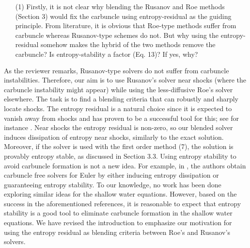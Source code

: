 \documentclass[english,11pt]{article}
\begin{document}
\bigskip
{\color{red}
  \begin{itemize}
    \item[(1)]
      Firstly, it is not clear why blending the Rusanov and Roe methods (Section 3) would fix the carbuncle
      using entropy-residual as the guiding principle. From literature, it is obvious that Roe-type methods suffer
      from carbuncle whereas Rusanov-type schemes do not. But why using the entropy-residual somehow
      makes the hybrid of the two methods remove the carbuncle? Is entropy-stability a factor (Eq. 13)? If yes,
      why?
  \end{itemize}
}
\noindent
As the reviewer remarks, Rusanov-type solvers do not suffer from carbuncle instabilities. Therefore,
our aim is to use Rusanov's solver near shocks (where the carbuncle instability might appear) 
while using the less-diffusive Roe's solver elsewhere.
The task is to find a blending criteria that can robustly and sharply locate shocks.
The entropy residual is a natural choice since it is expected to vanish away
from shocks and has proven to be a successful tool for this; see for instance
\cite{guermond2011,guermond2018}. 
%
Near shocks the entropy residual is non-zero, so our blended solver induces dissipation of entropy near shocks,
similarly to the exact solution. Moreover, if the solver is used with the first order method (7),
the solution is provably entropy stable, as discussed in Section 3.3.
Using entropy stability to avoid carbuncle formation is not a new idea. For example, in \cite{ismail2009,ismail2009v2},
the authors obtain carbuncle free solvers for Euler by either inducing entropy dissipation or guaranteeing entropy stability. 
To our knowledge, no work has been done exploring similar ideas for the shallow water equations. However, based on
the success in the aforementioned references, it is reasonable to expect that entropy stability is a good tool to
eliminate carbuncle formation in the shallow water equations. 
%
We have revised the introduction to emphasize our motivation for using the entropy residual as blending
criteria between Roe's and Rusanov's solvers. 
\end{document}
